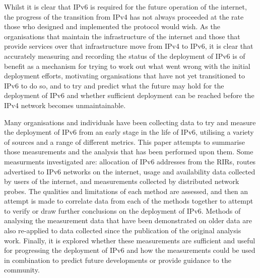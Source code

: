Whilst it is clear that IPv6 is required for the future operation of the
internet\cite{huston_ipv6_2008}, the progress of the transition from IPv4  has not always proceeded
at the rate those who designed and implemented the protocol would wish. As the
organisations that maintain the infrastructure of the internet and those that
provide services over that infrastructure move from IPv4 to IPv6, it is clear
that accurately measuring and recording the status of the deployment of IPv6
is of benefit as a mechanism for trying to work out what went wrong with
the initial deployment efforts, motivating organisations that have not yet
transitioned to IPv6 to do so, and to try and predict what the future may hold
for the deployment of IPv6 and whether sufficient deployment can be reached before
the IPv4 network becomes unmaintainable\cite{huston_primer_2013}.

Many organisations and individuals have been collecting data to try and measure
the deployment of IPv6 from an
early stage in the life of IPv6, utilising a variety of sources and a range of
different metrics. This paper attempts to summarise those measurements and
the analysis that has been performed upon them. Some measurments investigated
are: allocation of IPv6 addresses from the RIRs, routes advertised to IPv6
networks on the internet,  
usage and availability data collected by users of the internet, and measurements
collected by distributed network probes.
The qualities and limitations of each method are assessed, and then an attempt
is made to correlate data from each of the methods together to attempt to verify
or draw further conclusions on the deployment of IPv6. Methods of analysing the
measurement data that have been demonstrated on older data are 
also re-applied to data collected since the publication of the original
analysis work. Finally, it is explored whether these
measurements are sufficient and useful for progressing
the deployment of IPv6 and how the measurements could be used in combination to
predict future developments or provide guidance to the community.

